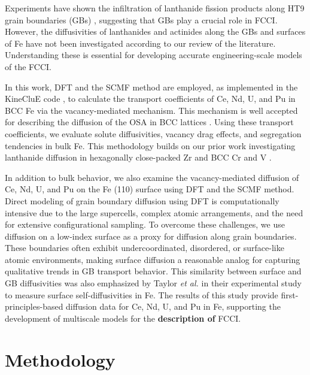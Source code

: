 \documentclass[preprint,12pt]{elsarticle}
\providecommand{\DIFaddtex}[1]{{\bf #1}} %
\providecommand{\DIFdeltex}[1]{} %
\providecommand{\DIFaddbegin}{\protect\color{blue}} %
\providecommand{\DIFaddend}{\protect\color{black}} %
\providecommand{\DIFdelbegin}{\protect\color{red}} %
\providecommand{\DIFdelend}{\protect\color{black}} %
\providecommand{\DIFadd}[1]{\texorpdfstring{\DIFaddtex{#1}}{#1}} %
\providecommand{\DIFdel}[1]{\texorpdfstring{\DIFdeltex{#1}}{}} %
\newcommand{\DIFscaledelfig}{0.5}
\newlength{\DIFdelgraphicswidth} %
\newlength{\DIFdelgraphicsheight} %
\newcommand{\DIFaddincludegraphics}[2][]{{\color{blue}\fbox{\DIFOincludegraphics[#1]{#2}}}} %
\newcommand{\DIFdelincludegraphics}[2][]{%
\sbox{\DIFdelgraphicsbox}{\DIFOincludegraphics[#1]{#2}}%
\settoboxwidth{\DIFdelgraphicswidth}{\DIFdelgraphicsbox} %
\settoboxtotalheight{\DIFdelgraphicsheight}{\DIFdelgraphicsbox} %
\scalebox{\DIFscaledelfig}{%
\parbox[b]{\DIFdelgraphicswidth}{\usebox{\DIFdelgraphicsbox}\\[-\baselineskip] \rule{\DIFdelgraphicswidth}{0em}}\llap{\resizebox{\DIFdelgraphicswidth}{\DIFdelgraphicsheight}{%
\setlength{\unitlength}{\DIFdelgraphicswidth}%
\begin{picture}(1,1)%
\thicklines\linethickness{2pt} %
{\color[rgb]{1,0,0}\put(0,0){\framebox(1,1){}}}%
{\color[rgb]{1,0,0}\put(0,0){\line( 1,1){1}}}%
{\color[rgb]{1,0,0}\put(0,1){\line(1,-1){1}}}%
\end{picture}%
}\hspace*{3pt}}} %
} %
\DeclareRobustCommand{\DIFaddbegin}{\DIFOaddbegin \let\includegraphics\DIFaddincludegraphics} %
\DeclareRobustCommand{\DIFaddend}{\DIFOaddend \let\includegraphics\DIFOincludegraphics} %
\DeclareRobustCommand{\DIFdelbegin}{\DIFOdelbegin \let\includegraphics\DIFdelincludegraphics} %
\DeclareRobustCommand{\DIFdelend}{\DIFOaddend \let\includegraphics\DIFOincludegraphics} %
\begin{document}
Experiments have shown the infiltration of lanthanide fission products along HT9 grain boundaries (GBs) \cite{wang2022small, wang2024transmission}, suggesting that GBs play a crucial role in FCCI. However, the diffusivities of lanthanides and actinides along the GBs and surfaces of Fe have not been investigated according to our review of the literature. Understanding these is essential for developing accurate engineering-scale models of the FCCI.

In this work, DFT and the SCMF method are employed, as implemented in the KineCluE code \cite{schuler_kineclue_2020}, to calculate the \DIFdelbegin \DIFdel{exact }\DIFdelend transport coefficients of Ce, Nd, U, and Pu in BCC Fe via the vacancy-mediated mechanism. This mechanism is well accepted for describing the diffusion of the OSA in BCC lattices \cite{ bocquet_migration_2017,yang_significant_2023}. Using these transport coefficients, we evaluate solute diffusivities, vacancy drag effects, and segregation tendencies in bulk Fe. This methodology builds on our prior work investigating lanthanide diffusion in hexagonally close-packed Zr \cite{shousha2024first} and BCC Cr and V \cite{shousha_cr}. 

In addition to bulk behavior, we also examine the vacancy-mediated diffusion of Ce, Nd, U, and Pu on the Fe (110) surface using DFT and the SCMF method. Direct modeling of grain boundary diffusion using DFT is computationally intensive due to the large supercells, complex atomic arrangements, and the need for extensive configurational sampling. To overcome these challenges, we use diffusion on a low-index surface as a proxy for diffusion along grain boundaries. These boundaries often exhibit undercoordinated, disordered, or surface-like atomic environments, making surface diffusion a reasonable analog for capturing qualitative trends in GB transport behavior. This similarity between surface and GB diffusivities was also emphasized by Taylor \textit{et al.} \cite{taylor2024directly} in their experimental study to measure surface self-diffusivities in Fe.
The results of this study provide first-principles-based diffusion data for Ce, Nd, U, and Pu in Fe, supporting the development of multiscale models for the \DIFaddbegin \DIFadd{description of }\DIFaddend FCCI.



\FloatBarrier
\section{Methodology}
\FloatBarrier
\end{document}
